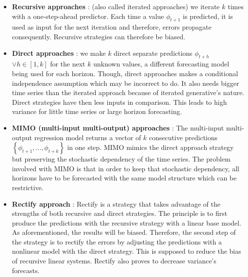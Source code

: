 \documentclass[11pt,a4paper,oneside]{book}
\begin{document}
\begin{itemize}
    \item \textbf{Recursive approaches} : (also called iterated approaches) we iterate $k$ times with a one-step-ahead predictor. Each time a value $\phi_{t+1}$ is predicted, it is used as input for the next iteration and therefore, errors propagate consequently. Recursive strategies can therefore be biased.
    \item \textbf{Direct approaches} : we make $k$ direct separate predictions $\phi_{t+h}$ $\vee h \in \left[1, k\right]$ for the next $k$ unknown values, a different forecasting model being used for each horizon. Though, direct approaches makes a conditional independence assumption which may be incorrect to do. It also needs bigger time series than the iterated approach because of iterated generative's nature. Direct strategies have then less inputs in comparison. This leads to high variance for little time series or large horizon forecasting.
    \item \textbf{MIMO (multi-input multi-output) approaches} : The multi-input multi-output regression model returns a vector of $k$ consecutive predictions $\left\{\phi_{t+1},...,\phi_{t+k}\right\}$ in one step. MIMO mimics the direct approach strategy but preserving the stochastic dependency of the time series. The problem involved with MIMO is that in order to keep that stochastic dependency, all horizons have to be forecasted with the same model structure which can be restrictive. \cite{Bonte}\cite{taiebonte}
    \item \textbf{Rectify approach} : Rectify is a strategy that takes advantage of the strengths of both recursive and direct strategies. The principle is to first produce the predictions with the recursive strategy with a linear base model. As aforementioned, the results will be biased. Therefore, the second step of the strategy is to rectify the errors by adjusting the predictions with a nonlinear model with the direct strategy. This is supposed to reduce the bias of recursive linear systems. Rectify also proves to decrease variance's forecasts. \cite{BenTaieb}
\end{itemize}
\end{document}
